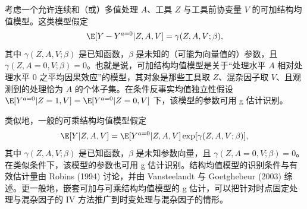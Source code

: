 \begin{techpoint}[更一般的结构均值模型]
考虑一个允许连续和（或）多值处理 $A$、工具 $Z$ 与工具前协变量 $V$ 的可加结构均值模型。这类模型假定
\[
\E[Y-Y^{a=0}|Z,A,V]=\gamma(Z,A,V;\beta),
\]
其中 $\gamma(Z,A,V;\beta)$ 是已知函数，$\beta$ 是未知的（可能为向量值的）参数，且 $\gamma(Z,A=0,V;\beta)=0$。也就是说，可加结构均值模型是关于“处理水平 $A$ 相对处理水平 0 之平均因果效应”的模型，其对象是那些工具取 $Z$、混杂因子取 $V$、且观测到的处理恰为 $A$ 的个体子集。在条件反事实均值独立性假设 $\E[Y^{a=0}|Z=1,V]=\E[Y^{a=0}|Z=0,V]$ 下，该模型的参数可用 g 估计识别。

类似地，一般的可乘结构均值模型假定
\[
\E[Y|Z,A,V]=\E[Y^{a=0}|Z,A,V]\exp[\gamma(Z,A,V;\beta)],
\]
其中 $\gamma(Z,A,V;\beta)$ 是已知函数，$\beta$ 是未知参数向量，且 $\gamma(Z,A=0,V;\beta)=0$。在类似条件下，该模型的参数也可用 g 估计识别。结构均值模型的识别条件与有效估计量由 Robins (1994) 讨论，并由 Vansteelandt 与 Goetghebeur (2003) 综述。更一般地，嵌套可加与可乘结构均值模型的 g 估计，可以把针对时点固定处理与混杂因子的 IV 方法推广到时变处理与混杂因子的情形。
\end{techpoint}

